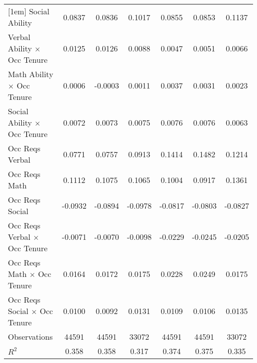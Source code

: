 {\begin{tabular}{l*{6}{c}}
[1em]
Social Ability      &      0.0837\sym{***}&      0.0836\sym{***}&      0.1017\sym{***}&      0.0855\sym{***}&      0.0853\sym{***}&      0.1137\sym{***}\\
[1em]
Verbal Ability $\times$ Occ Tenure&      0.0125\sym{**} &      0.0126\sym{**} &      0.0088         &      0.0047         &      0.0051         &      0.0066         \\
[1em]
Math Ability $\times$ Occ Tenure&      0.0006         &     -0.0003         &      0.0011         &      0.0037         &      0.0031         &      0.0023         \\
[1em]
Social Ability $\times$ Occ Tenure&      0.0072\sym{**} &      0.0073\sym{**} &      0.0075\sym{**} &      0.0076\sym{**} &      0.0076\sym{**} &      0.0063         \\
[1em]
Occ Reqs Verbal     &      0.0771         &      0.0757         &      0.0913         &      0.1414         &      0.1482         &      0.1214         \\
[1em]
Occ Reqs Math       &      0.1112         &      0.1075         &      0.1065         &      0.1004         &      0.0917         &      0.1361         \\
[1em]
Occ Reqs Social     &     -0.0932\sym{**} &     -0.0894\sym{**} &     -0.0978\sym{**} &     -0.0817\sym{**} &     -0.0803\sym{**} &     -0.0827\sym{**} \\
[1em]
Occ Reqs Verbal $\times$ Occ Tenure&     -0.0071         &     -0.0070         &     -0.0098         &     -0.0229         &     -0.0245         &     -0.0205         \\
[1em]
Occ Reqs Math $\times$ Occ Tenure&      0.0164         &      0.0172         &      0.0175         &      0.0228         &      0.0249         &      0.0175         \\
[1em]
Occ Reqs Social $\times$ Occ Tenure&      0.0100\sym{**} &      0.0092\sym{**} &      0.0131\sym{***}&      0.0109\sym{**} &      0.0106\sym{**} &      0.0135\sym{**} \\
\hline  
Observations        &       44591         &       44591         &       33072         &       44591         &       44591         &       33072         \\
\(R^{2}\)           &       0.358         &       0.358         &       0.317         &       0.374         &       0.375         &       0.335         \\
\hline  
\end{tabular}
}
